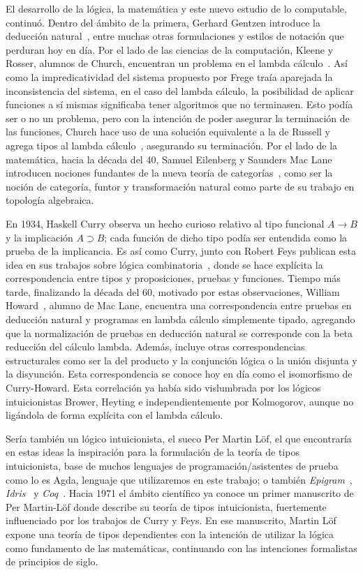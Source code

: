 El desarrollo de la lógica, la matemática y este nuevo estudio de lo computable, continuó. Dentro del ámbito de la primera, Gerhard Gentzen introduce la deducción natural~, entre muchas otras formulaciones y estilos de notación que perduran hoy en día. Por el lado de las ciencias de la computación, Kleene y Rosser, alumnos de Church, encuentran un problema en el lambda cálculo~. Así como la impredicatividad del sistema propuesto por Frege traía aparejada la inconsistencia del sistema, en el caso del lambda cálculo, la posibilidad de aplicar funciones a sí mismas significaba tener algoritmos que no terminasen. Esto podía ser o no un problema, pero con la intención de poder asegurar la terminación de las funciones, Church hace uso de una solución equivalente a la de Russell y agrega tipos al lambda cálculo~, asegurando su terminación. Por el lado de la matemática, hacia la década del 40, Samuel Eilenberg y Saunders Mac Lane introducen nociones fundantes de la nueva teoría de categorías~, como ser la noción de categoría, funtor y transformación natural como parte de su trabajo en topología algebraica. 

En 1934, Haskell Curry observa un hecho curioso relativo al tipo funcional $A \to B$ y la implicación $A \supset B$; cada función de dicho tipo  podía ser entendida como la prueba de la implicancia. Es así como Curry, junto con Robert Feys publican esta idea en sus trabajos sobre lógica combinatoria~, donde se hace explícita la correspondencia entre tipos y proposiciones, pruebas y funciones. Tiempo más tarde, finalizando la década del 60, motivado por estas observaciones, William Howard~, alumno de Mac Lane, encuentra una correspondencia entre pruebas en deducción natural y programas en lambda cálculo simplemente tipado, agregando que la normalización de pruebas en deducción natural se corresponde con la beta reducción del cálculo lambda. Además, incluye otras correspondencias estructurales como ser la del producto y la conjunción lógica o la unión disjunta y la disyunción. Esta correspondencia se conoce hoy en día como el isomorfismo de Curry-Howard. Esta correlación ya había sido vislumbrada por los lógicos intuicionistas Brower, Heyting e independientemente por Kolmogorov, aunque no ligándola de forma explícita con el lambda cálculo.

Sería también un lógico intuicionista, el sueco Per Martin Löf, el que encontraría en estas ideas la inspiración para la formulación de la teoría de tipos intuicionista, base de muchos lenguajes de programación/asistentes de prueba como lo es Agda, lenguaje que utilizaremos en este trabajo; o también {\it Epigram}~\cite{mcbride:epigram}, {\it Idris}~\cite{brady:idris,idris} y {\it Coq}~\cite{coq}.
Hacia 1971 el ámbito científico ya conoce un primer manuscrito de Per Martin-Löf donde describe su teoría de tipos intuicionista, fuertemente influenciado por los trabajos de Curry y Feys. En ese manuscrito, Martin Löf expone una teoría de tipos dependientes con la intención de utilizar la lógica como fundamento de las matemáticas, continuando con las intenciones formalistas de principios de siglo.


